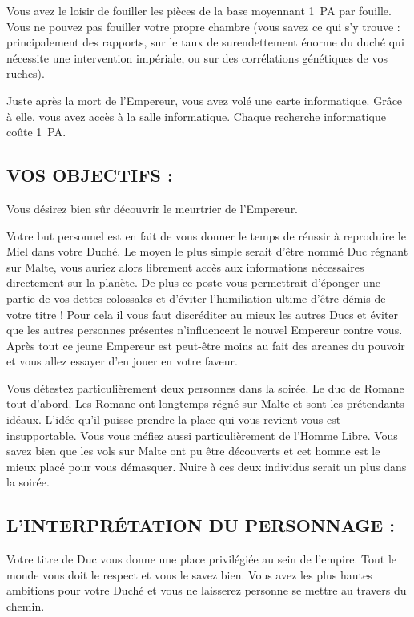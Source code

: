 \documentclass[14pt,twocolumn]{extarticle}
\begin{document}
Vous avez le loisir de fouiller les pièces de la base moyennant 1~PA par
fouille. Vous ne pouvez pas fouiller votre propre chambre (vous savez ce qui
s’y trouve : principalement des rapports, sur le taux de surendettement énorme
du duché qui nécessite une intervention impériale, ou sur des corrélations
génétiques de vos ruches).

Juste après la mort de l’Empereur, vous avez volé une carte informatique.
Grâce à elle, vous avez accès à la salle informatique. Chaque recherche
informatique coûte 1~PA.

\subsection{VOS OBJECTIFS :}

Vous désirez bien sûr découvrir le meurtrier de l’Empereur.

Votre but personnel est en fait de vous donner le temps de réussir à reproduire
le Miel dans votre Duché. Le moyen le plus simple serait d’être nommé Duc
régnant sur Malte, vous auriez alors librement accès aux informations
nécessaires directement sur la planète. De plus ce poste vous permettrait
d’éponger une partie de vos dettes colossales et d’éviter l’humiliation ultime
d’être démis de votre titre ! Pour cela il vous faut discréditer au mieux les
autres Ducs et éviter que les autres personnes présentes n’influencent le
nouvel Empereur contre vous.  Après tout ce jeune Empereur est peut-être moins
au fait des arcanes du pouvoir et vous allez essayer d’en jouer en votre
faveur.

Vous détestez particulièrement deux personnes dans la soirée. Le duc de Romane
tout d’abord. Les Romane ont longtemps régné sur Malte et sont les prétendants
idéaux. L’idée qu’il puisse prendre la place qui vous revient vous est
insupportable. Vous vous méfiez aussi particulièrement de l’Homme Libre. Vous
savez bien que les vols sur Malte ont pu être découverts et cet homme est le
mieux placé pour vous démasquer. Nuire à ces deux individus serait un plus dans
la soirée.

\subsection{L'INTERPRÉTATION DU PERSONNAGE :}

Votre titre de Duc vous donne une place privilégiée au sein de l’empire. Tout
le monde vous doit le respect et vous le savez bien. Vous avez les plus hautes
ambitions pour votre Duché et vous ne laisserez personne se mettre au travers
du chemin.
\end{document}
